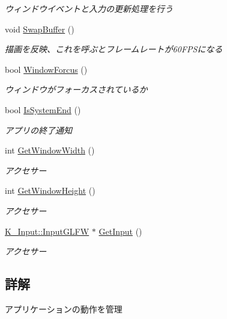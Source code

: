 \begin{DoxyCompactItemize}
\begin{DoxyCompactList}\small\item\em ウィンドウイベントと入力の更新処理を行う \end{DoxyCompactList}\item 
void \mbox{\hyperlink{class_k___system_1_1_system_class_afe66afc17d7cad5199f4e8a1dd62b472}{Swap\+Buffer}} ()
\begin{DoxyCompactList}\small\item\em 描画を反映、これを呼ぶとフレームレートが60\+F\+P\+Sになる \end{DoxyCompactList}\item 
bool \mbox{\hyperlink{class_k___system_1_1_system_class_ab36bf9672ef9967b829b95da744c5394}{Window\+Forcus}} ()
\begin{DoxyCompactList}\small\item\em ウィンドウがフォーカスされているか \end{DoxyCompactList}\item 
bool \mbox{\hyperlink{class_k___system_1_1_system_class_a5c776515e01bcba724c6fa64db4897c0}{Is\+System\+End}} ()
\begin{DoxyCompactList}\small\item\em アプリの終了通知 \end{DoxyCompactList}\item 
int \mbox{\hyperlink{class_k___system_1_1_system_class_a8b1226fbf696428544adfa890430cac1}{Get\+Window\+Width}} ()
\begin{DoxyCompactList}\small\item\em アクセサー \end{DoxyCompactList}\item 
int \mbox{\hyperlink{class_k___system_1_1_system_class_a77b2bd403ce58a63f48151054ee2402e}{Get\+Window\+Height}} ()
\begin{DoxyCompactList}\small\item\em アクセサー \end{DoxyCompactList}\item 
\mbox{\hyperlink{class_k___input_1_1_input_g_l_f_w}{K\+\_\+\+Input\+::\+Input\+G\+L\+FW}} $\ast$ \mbox{\hyperlink{class_k___system_1_1_system_class_ac4f7977cb0325fe9ac581ed1942404a0}{Get\+Input}} ()
\begin{DoxyCompactList}\small\item\em アクセサー \end{DoxyCompactList}\end{DoxyCompactItemize}


\subsection{詳解}
アプリケーションの動作を管理


